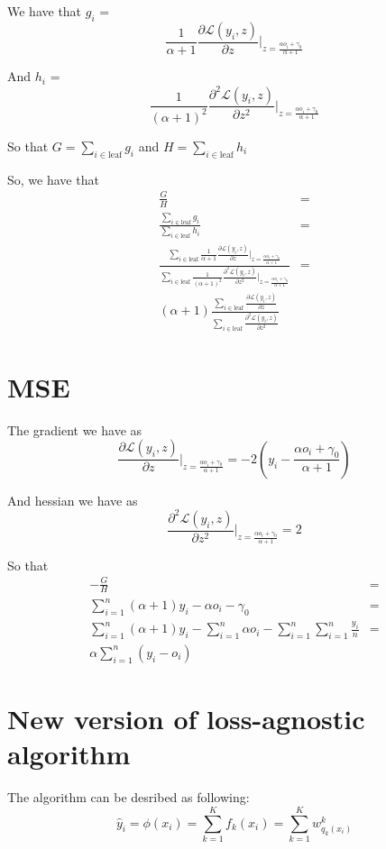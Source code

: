\documentclass{article}
\begin{document}
We have that $g_i$ = \[
\frac{1}{\alpha + 1} \frac{\partial \mathcal{L}(y_i, z)}{\partial z}\big|_{z = \frac{\alpha o_i + \gamma_0}{\alpha + 1}}
\]

And $h_i$ = \[
\frac{1}{(\alpha + 1)^2} \frac{\partial^2 \mathcal{L}(y_i, z)}{\partial z^2}\big|_{z = \frac{\alpha o_i + \gamma_0}{\alpha + 1}}
\]

So that $G = \sum_{i \in \text{leaf}} g_i$ and $H = \sum_{i \in \text{leaf}} h_i$ 

So, we have that \begin{align*}
    \frac{G}{H} &= \\
    \frac{\sum_{i \in \text{leaf}} g_i}{\sum_{i \in \text{leaf}} h_i} &= \\
    \frac{\sum_{i \in \text{leaf}} \frac{1}{\alpha + 1} \frac{\partial \mathcal{L}(y_i, z)}{\partial z}\big|_{z = \frac{\alpha o_i + \gamma_0}{\alpha + 1}}}{\sum_{i \in \text{leaf}} \frac{1}{(\alpha + 1)^2} \frac{\partial^2 \mathcal{L}(y_i, z)}{\partial z^2}\big|_{z = \frac{\alpha o_i + \gamma_0}{\alpha + 1}}} &= \\
    (\alpha + 1)\frac{\sum_{i \in \text{leaf}} \frac{\partial \mathcal{L}(y_i, z)}{\partial z}}{\sum_{i \in \text{leaf}} \frac{\partial^2 \mathcal{L}(y_i, z)}{\partial z^2}}
\end{align*}


\section*{MSE}
The gradient we have as \[
    \frac{\partial \mathcal{L}(y_i, z)}{\partial z}\big|_{z = \frac{\alpha o_i + \gamma_0}{\alpha + 1}} = -2 \left( y_i - \frac{\alpha o_i + \gamma_0}{\alpha + 1} \right)
\]

And hessian we have as \[
    \frac{\partial^2 \mathcal{L}(y_i, z)}{\partial z^2}\big|_{z = \frac{\alpha o_i + \gamma_0}{\alpha + 1}} = 2
\]

So that \begin{align*}
    -\frac{G}{H} &= \\
    \sum_{i=1}^n (\alpha + 1)y_i - \alpha o_i - \gamma_0 &= \\
    \sum_{i=1}^n (\alpha + 1)y_i - \sum_{i=1}^n \alpha o_i - \sum_{i=1}^n \sum_{i=1}^n \frac{y_i}{n} &= \\
    \alpha \sum_{i=1}^n (y_i - o_i)
\end{align*}

\section*{New version of loss-agnostic algorithm}
The algorithm can be desribed as following:
\[
\hat{y}_i = \phi(x_i) = \sum_{k=1}^K f_k(x_i) = \sum_{k=1}^K w^k_{q_k(x_i)}
\]
\end{document}
